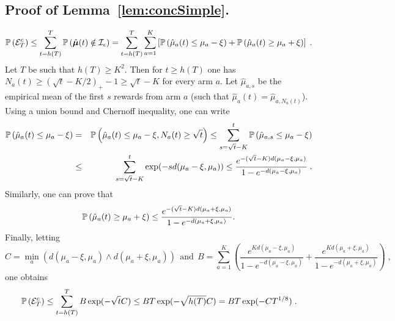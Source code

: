 \documentclass{colt2016} %
\begin{document}
\subsection{Proof of Lemma~\ref{lem:concSimple}.} 
\[\mathbb{P}\left(\mathcal{E}_T^c\right) \leq \sum_{t=h(T)}^{T} \mathbb{P}\left(\hat{\bm\mu}(t) \notin \mathcal{I}_\epsilon \right) = \sum_{t=h(T)}^{T}\sum_{a=1}^{K} \left[\mathbb{P}\left(\hat{\mu}_a(t) \leq \mu_a  - \xi\right) +  \mathbb{P}\left(\hat{\mu}_a(t) \geq \mu_a + \xi\right)\right]\;. \]
Let $T$ be such that $h(T) \geq K^2$. Then for $t \geq h(T)$ one has $N_a(t) \geq (\sqrt{t} - K/2)_+ -1 \geq \sqrt{t} - K$ for every arm $a$.  Let $\hat{\mu}_{a,s}$ be the empirical mean of the first $s$ rewards from arm $a$ (such that $\hat{\mu}_a(t) = \hat{\mu}_{a,N_a(t)}$). Using a union bound and Chernoff inequality, one can write
\begin{eqnarray*}
 \mathbb{P}\left(\hat{\mu}_a(t) \leq \mu_a - \xi\right) & = &  \mathbb{P}\left(\hat{\mu}_a(t) \leq \mu_a - \xi, N_a(t) \geq \sqrt{t}\right)  \leq  \sum_{s=\sqrt{t} - K}^t \mathbb{P}\left(\hat{\mu}_{a,s} \leq \mu_a - \xi\right) \\
 & \leq & \sum_{s=\sqrt{t}-K}^t \exp(-s d(\mu_a - \xi,\mu_a)) \leq \frac{e^{-(\sqrt{t}-K)d(\mu_a - \xi,\mu_a)}}{1 - e^{-d(\mu_a - \xi,\mu_a)}}\;.
\end{eqnarray*}
Similarly, one can prove that 
\begin{eqnarray*}
 \mathbb{P}\left(\hat{\mu}_a(t) \geq \mu_a + \xi\right)\leq \frac{e^{-(\sqrt{t}-K)d(\mu_a + \xi,\mu_a)}}{1 - e^{-d(\mu_a + \xi,\mu_a)}}.
\end{eqnarray*}
Finally, letting 
\[C = \min_a\left(d(\mu_a - \xi,\mu_a)\wedge d(\mu_a+ \xi,\mu_a)\right) \  \ \text{and}  \ \ B = \sum_{a=1}^{K}\left( \frac{e^{Kd(\mu_a-\xi,\mu_a)}}{1 - e^{-d(\mu_a - \xi,\mu_a)}} + \frac{e^{Kd(\mu_a+\xi,\mu_a)}}{1 - e^{-d(\mu_a + \xi,\mu_a)}}\right)\;,\]
one obtains 
\[\mathbb{P}\left(\mathcal{E}_T^c\right) \leq \sum_{t=h(T)}^{T} B\exp(-\sqrt{t} C) \leq  B T \exp(-\sqrt{h(T)} C) =  B T \exp(-C T^{1/8})\;. \]
\end{document}
